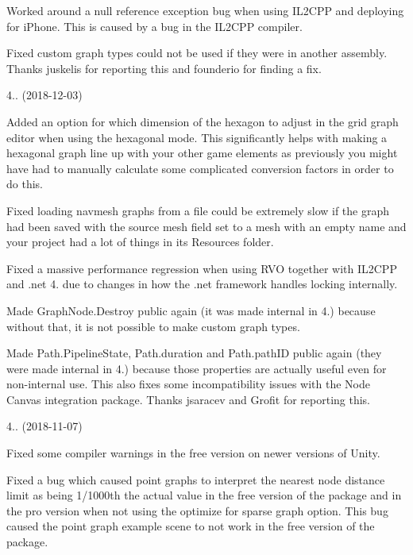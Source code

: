 \begin{DoxyItemize}
\begin{DoxyItemize}
\item Worked around a null reference exception bug when using I\+L2\+C\+PP and deploying for i\+Phone. This is caused by a bug in the I\+L2\+C\+PP compiler.
\item Fixed custom graph types could not be used if they were in another assembly. Thanks juskelis for reporting this and founderio for finding a fix.
\end{DoxyItemize}
\item 4.. (2018-\/12-\/03)
\begin{DoxyItemize}
\item Added an option for which dimension of the hexagon to adjust in the grid graph editor when using the hexagonal mode. This significantly helps with making a hexagonal graph line up with your other game elements as previously you might have had to manually calculate some complicated conversion factors in order to do this.
\item Fixed loading navmesh graphs from a file could be extremely slow if the graph had been saved with the source mesh field set to a mesh with an empty name and your project had a lot of things in its Resources folder.
\item Fixed a massive performance regression when using R\+VO together with I\+L2\+C\+PP and .net 4. due to changes in how the .net framework handles locking internally.
\item Made Graph\+Node.\+Destroy public again (it was made internal in 4.) because without that, it is not possible to make custom graph types.
\item Made Path.\+Pipeline\+State, Path.\+duration and Path.\+path\+ID public again (they were made internal in 4.) because those properties are actually useful even for non-\/internal use. This also fixes some incompatibility issues with the Node Canvas integration package. Thanks jsaracev and Grofit for reporting this.
\end{DoxyItemize}
\item 4.. (2018-\/11-\/07)
\begin{DoxyItemize}
\item Fixed some compiler warnings in the free version on newer versions of Unity.
\item Fixed a bug which caused point graphs to interpret the nearest node distance limit as being 1/1000th the actual value in the free version of the package and in the pro version when not using the \textquotesingle{}optimize for sparse graph\textquotesingle{} option. This bug caused the point graph example scene to not work in the free version of the package.

\end{DoxyItemize}
\end{DoxyItemize}
